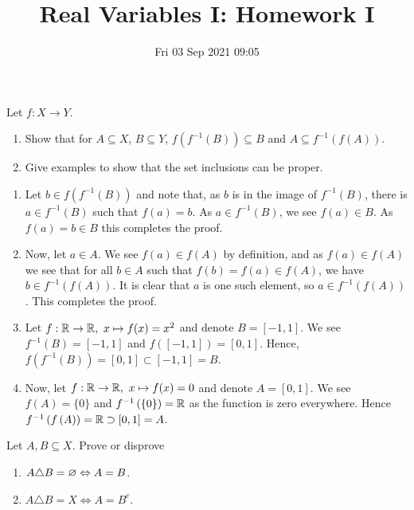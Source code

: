 \documentclass[a4paper]{article}
\title{Real Variables I: Homework I}
\date{Fri 03 Sep 2021 09:05}
\begin{document}
\maketitle
\begin{problem}[1]
	Let \(f:X \to Y\).
	\begin{enumerate}
		\item Show that for \(A\subseteq X\), \(B\subseteq Y\), \(f\left( f^{-1}\left( B \right)  \right) \subseteq B\) and \(A \subseteq f^{-1}\left( f\left( A \right)  \right) \).
			\item Give examples to show that the set inclusions can be proper.
	\end{enumerate}
\end{problem}
\begin{solution}
	\begin{enumerate}
	\item Let \(b \in f\left( f^{-1} \left( B \right)  \right) \) and note that, as \(b\) is in the image of \(f^{-1}\left( B \right) \), there is \(a \in f^{-1}\left( B \right) \) such that \(f\left( a \right) = b\). As \(a \in f^{-1} \left( B \right) \), we see \(f\left( a \right) \in B\). As \(f\left( a \right) = b \in B\) this completes the proof.\\
	\item Now, let \(a \in A\). We see \(f\left( a \right) \in f\left( A \right) \) by definition, and as \(f\left( a \right) \in f\left( A \right) \) we see that for all \(b \in A\) such that \(f\left( b \right) = f\left( a \right) \in f\left( A \right) \), we have \(b \in f^{-1} \left( f\left( A \right)  \right) \). It is clear that \(a\) is one such element, so \(a \in f^{-1} \left( f\left( A \right)  \right) \). This completes the proof.
	\item Let \(f: \mathbb{R} \to \mathbb{R}, \ x \mapsto f(x) = x^2\) and denote \(B = [-1,1]\). We see \(f^{-1} \left( B \right) = [-1,1]\) and \(f\left( [-1, 1] \right) = [0, 1]\). Hence, \(f\left( f^{-1} \left( B \right) \right) = [0, 1] \subset [-1, 1] = B\).
	\item Now, let \(f: \mathbb{R} \to \mathbb{R}, \ x \mapsto f(x) = 0\) and denote \(A = [0, 1]\). We see \(f\left( A \right) = \{0\} \) and \(f^{-1}\left( \{0\}  \right) = \mathbb{R} \) as the function is zero everywhere. Hence \(f^{-1} \left( f\left( A \right)  \right) = \mathbb{R} \supset [0, 1] = A\).
	\end{enumerate}
\end{solution}
\newpage
\begin{problem}[2]
	Let \(A, B \subseteq X\). Prove or disprove
	\begin{enumerate}
		\item \(A \triangle B = \varnothing \Leftrightarrow A = B\).
			\item \(A \triangle B = X \iff A = B^{c}\).
	\end{enumerate}
\end{problem}
\end{document}
